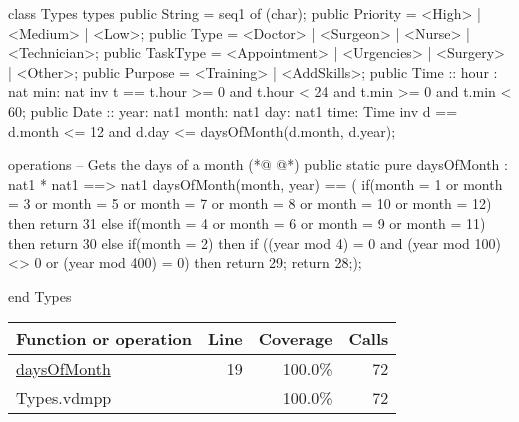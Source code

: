 \begin{vdmpp}[breaklines=true]
class Types
types
 public String = seq1 of (char);
 public Priority = <High> | <Medium> | <Low>;
 public Type = <Doctor> | <Surgeon> | <Nurse> | <Technician>;
 public TaskType = <Appointment> | <Urgencies> | <Surgery> | <Other>;
 public Purpose = <Training> | <AddSkills>;
 public Time :: hour : nat
         min: nat
 inv t == t.hour >= 0 and t.hour < 24 and t.min >= 0 and t.min < 60;
 public Date ::  year: nat1
         month: nat1
         day: nat1
         time: Time
 inv d == d.month <= 12 and d.day <= daysOfMonth(d.month, d.year);
 
operations
 -- Gets the days of a month
(*@
\label{daysOfMonth:19}
@*)
 public static pure daysOfMonth : nat1 * nat1 ==> nat1
  daysOfMonth(month, year) == (
              if(month = 1 or month = 3 or month = 5 or month = 7 or month = 8 or month = 10 or month = 12)
               then return 31
              else if(month = 4 or month = 6 or month = 9 or month = 11)
               then return 30
              else if(month = 2)
               then if ((year mod 4) = 0 and (year mod 100) <> 0 or (year mod 400) = 0)
                then return 29;
              return 28;);
                
end Types
\end{vdmpp}
\bigskip
\begin{longtable}{|l|r|r|r|}
\hline
Function or operation & Line & Coverage & Calls \\
\hline
\hline
\hyperref[daysOfMonth:19]{daysOfMonth} & 19&100.0\% & 72 \\
\hline
\hline
Types.vdmpp & & 100.0\% & 72 \\
\hline
\end{longtable}

